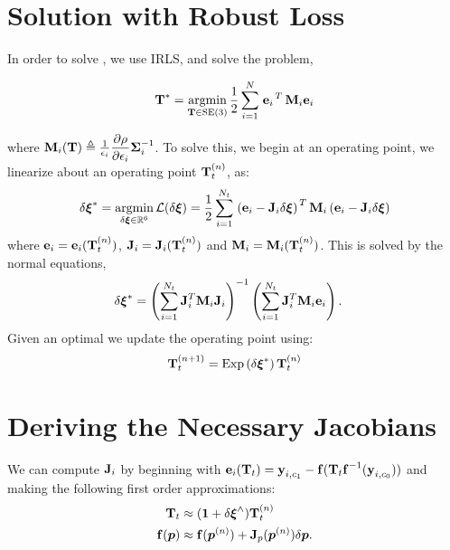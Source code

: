 \section{Solution with Robust Loss}

In order to solve , we use IRLS, and solve the problem,

\begin{equation}
\boldsymbol{\mathbf{T}}^* = \operatorname*{argmin}_{\boldsymbol{\mathbf{T}}\in\text{SE}(3)}\frac{1}{2} \sum_{i=1}^{N} 
\left.{\boldsymbol{\mathbf{e}}_{i}}\right.^T \boldsymbol{\mathbf{M}}_{i} \boldsymbol{\mathbf{e}}_{i} 
\end{equation}

where $ \boldsymbol{\mathbf{M}}_i(\boldsymbol{\mathbf{T}}) \triangleq \frac{1}{\epsilon_i} \dfrac{\partial \rho}{\partial \epsilon_i}  \boldsymbol{\mathbf{\Sigma}}_{i}^{-1}$.
To solve this, we begin at an operating point, we linearize about an operating point $\boldsymbol{\mathbf{T}}_t^{(n)}$, as:
\begin{equation}
 \delta \Vector{\xi}^* = \ArgMin{\delta \Vector{\xi} \in \RealNumbers{}^6} \mathcal{L}(\delta \Vector{\xi}) = \frac{1}{2}\sum_{i=1}^{N_t} 
  \Transpose{\left(\Vector{e}_{i}
  - \Matrix J_{i} \delta\Vector{\xi}\right)}
\Matrix{M}_i
 \left(\Vector{e}_{i}
 - \Matrix J_{i} \delta\Vector{\xi}\right)
  \end{equation}
where $\boldsymbol{\mathbf{e}}_{i} = \boldsymbol{\mathbf{e}}_{i}(\boldsymbol{\mathbf{T}}_t^{(n)})$, $\boldsymbol{\mathbf{J}}_{i} = \boldsymbol{\mathbf{J}}_{i}(\boldsymbol{\mathbf{T}}_t^{(n)})$ and $\boldsymbol{\mathbf{M}}_{i} = \boldsymbol{\mathbf{M}}_{i}(\boldsymbol{\mathbf{T}}_t^{(n)})$. This is solved by the normal equations,
\begin{align}
\delta\boldsymbol{\mathbf{\xi}}^* &= \left( \sum_{i=1}^{N_t} \boldsymbol{\mathbf{J}}_{i}^T \boldsymbol{\mathbf{M}}_i \boldsymbol{\mathbf{J}}_{i} \right)^{-1} \left( \sum_{i=1}^{N_t} \boldsymbol{\mathbf{J}}_{i}^T\boldsymbol{\mathbf{M}}_i \boldsymbol{\mathbf{e}}_i \right).
\end{align}
Given an optimal we update the operating point using:
\begin{equation}
	  \boldsymbol{\mathbf{T}}_t^{(n+1)} = \mathrm{Exp}\left({\delta\boldsymbol{\mathbf{\xi}}^*}\right) \boldsymbol{\mathbf{T}}_t^{(n)} 
\end{equation}

\section{Deriving the Necessary Jacobians}

We can compute $\boldsymbol{\mathbf{J}}_{i}$ by beginning with $\boldsymbol{\mathbf{e}}_{i}(\boldsymbol{\mathbf{T}}_t)  = \boldsymbol{\mathbf{y}}_{i, c_1} - \boldsymbol{\mathbf{f}}( \boldsymbol{\mathbf{T}}_t 
    \boldsymbol{\mathbf{f}}^{-1}( \boldsymbol{\mathbf{y}}_{i, c_0} ) )$ and making the following first order approximations:
    \begin{align}
    	\boldsymbol{\mathbf{T}}_t &\approx (\boldsymbol{\mathbf{1}} + \delta\boldsymbol{\mathbf{\xi}}^{\wedge}) \boldsymbol{\mathbf{T}}_t^{(n)} \\
    	\boldsymbol{\mathbf{f}}(\boldsymbol{p}) & \approx \boldsymbol{\mathbf{f}}(\boldsymbol{p}^{(n)}) + \boldsymbol{\mathbf{J}}_p (\boldsymbol{p}^{(n)})  \delta \boldsymbol{p}.
    \end{align}
    
